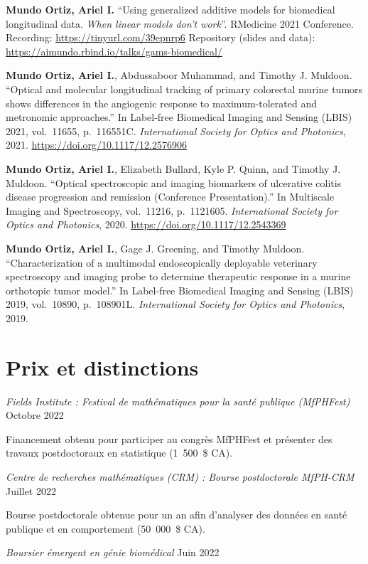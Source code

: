 \documentclass[10pt,]{article}
\begin{document}
\textbf{Mundo Ortiz, Ariel I.} ``Using generalized additive models for
biomedical longitudinal data. \emph{When linear models don't work}''.
RMedicine 2021 Conference. Recording: \url{https://tinyurl.com/39epnrp6}
Repository (slides and data):
\url{https://aimundo.rbind.io/talks/gams-biomedical/}

\textbf{Mundo Ortiz, Ariel I.}, Abdussaboor Muhammad, and Timothy J.
Muldoon. ``Optical and molecular longitudinal tracking of primary
colorectal murine tumors shows differences in the angiogenic response to
maximum-tolerated and metronomic approaches.'' In Label-free Biomedical
Imaging and Sensing (LBIS) 2021, vol.~11655, p.~116551C.
\emph{International Society for Optics and Photonics}, 2021.
\url{https://doi.org/10.1117/12.2576906}

\textbf{Mundo Ortiz, Ariel I.}, Elizabeth Bullard, Kyle P. Quinn, and
Timothy J. Muldoon. ``Optical spectroscopic and imaging biomarkers of
ulcerative colitis disease progression and remission (Conference
Presentation).'' In Multiscale Imaging and Spectroscopy, vol.~11216,
p.~1121605. \emph{International Society for Optics and Photonics}, 2020.
\url{https://doi.org/10.1117/12.2543369}

\textbf{Mundo Ortiz, Ariel I.}, Gage J. Greening, and Timothy Muldoon.
``Characterization of a multimodal endoscopically deployable veterinary
spectroscopy and imaging probe to determine therapeutic response in a
murine orthotopic tumor model.'' In Label-free Biomedical Imaging and
Sensing (LBIS) 2019, vol.~10890, p.~108901L. \emph{International Society
for Optics and Photonics}, 2019.

\section{Prix et distinctions}\label{prix-et-distinctions}

\emph{Fields Institute : Festival de mathématiques pour la santé
publique (MfPHFest)} \hfill Octobre 2022

Financement obtenu pour participer au congrès MfPHFest et présenter des
travaux postdoctoraux en statistique (1~500~\$ CA).

\emph{Centre de recherches mathématiques (CRM) : Bourse postdoctorale
MfPH-CRM} \hfill Juillet 2022

Bourse postdoctorale obtenue pour un an afin d'analyser des données en
santé publique et en comportement (50~000~\$ CA).

\emph{Boursier émergent en génie biomédical} \hfill Juin 2022
\end{document}
